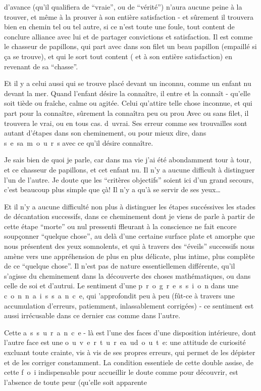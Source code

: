 
 

d'avance (qu'il qualifiera de ``vraie'', ou de ``vérité'') n'aura aucune peine à la trouver, et même à la prouver à son entière satisfaction - et sûrement il trouvera bien en chemin tel ou tel autre, si ce n'est toute une foule, tout content de conclure alliance avec lui et de partager convictions et satisfaction. Il est comme le chasseur de papillons, qui part avec dans son filet un beau papillon (empaillé si ça se trouve), et qui le sort tout content ( et à son entière satisfaction) en revenant de sa ``chasse''.

Et il y a celui aussi qui se trouve placé devant un inconnu, comme un enfant nu devant la mer. Quand l'enfant désire la connaître, il entre et la connaît - qu'elle soit tiède ou fraîche, calme ou agitée. Celui qu'attire telle chose inconnue, et qui part pour la connaître, sûrement la connaîtra peu ou prou Avec ou sans filet, il trouvera le vrai, ou en tous cas. \mbox{d u}\quad vrai. Ses erreur comme ses trouvailles sont autant d'étapes dans son cheminement, ou pour mieux dire, dans \mbox{s e s}\quad \mbox{a m o u r s} avec ce qu'il désire connaître.

Je sais bien de quoi je parle, car dans ma vie j'ai été abondamment tour à tour, et ce chasseur de papillons, et cet enfant nu. Il n'y a aucune difficult à distinguer l'un de l'autre. Je doute que les ``critères objectifs'' soient ici d'un grand secours, c'est beaucoup plus simple que çà! Il n'y a qu'à se servir de ses yeux\ldots

Et il n'y a aucune difficulté non plus à distinguer les étapes succéssives\unsure{,} les stades de décantation successifs, dans ce cheminement dont je viens de parle à partir de cette étape ``morte'' ou nul pressenti ffleurant à la conscience ne fait encore soupçonner ``quelque chose'', au delà d'une certaine surface plate et amorphe que nous présentent des yeux somnolents, et qui à travers des ``éveils'' successifs nous amène vers une appréhension de plus en plus délicate, plus intime, plus complète de ce ``quelque chose''. Il n'est pas de nature essentiellemen différente, qu'il s'agisse du cheminement dans la découverte des choses mathématiques, ou dans celle de soi et d'autrui. Le sentiment d'une \mbox{p r o g r e s s i o n} dans une \mbox{c o n n a i s s a n c e}, qui 'approfondit peu à peu (fût-ce à travers une accumulation d'erreurs, patiemment, inlassablement corrigées) - ce sentiment est aussi irrécusable dans ce dernier cas comme dans l'autre.

Cette \mbox{a s s u r a n c e} - là est l'une des faces d'une disposition intérieure, dont l'autre face est une \mbox{o u v e r t u r e}\quad \mbox{a u}\quad \mbox{d o u t e}: une attitude de curiosité excluant toute crainte, vis à vis de ses propres erreurs, qui permet de les dépister et de les corriger constamment. La condition essentiele de cette double assise, de cette \mbox{f o i} indispensable pour accueillir le doute comme pour découvrir, est l'absence de toute peur (qu'elle soit apparente
